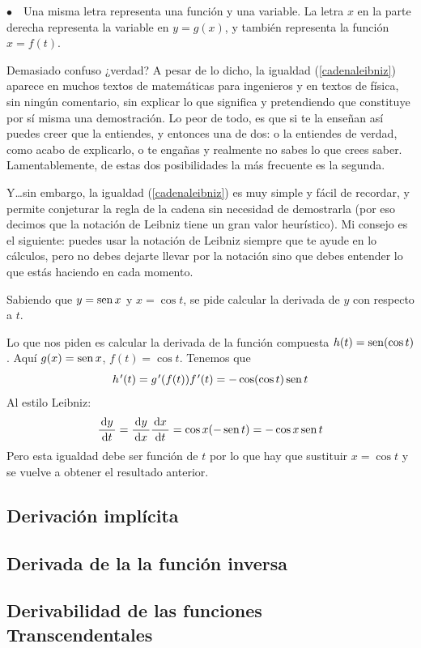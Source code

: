 \indent$\bullet\quad$Una misma letra representa una función y una
variable. La letra $x$ en la parte derecha representa la variable
en $y=g(x)$, y también representa la función $x=f(t)$.

Demasiado confuso ¿verdad? A pesar de lo dicho, la igualdad (\ref{cadenaleibniz})
aparece en muchos textos de matemáticas para ingenieros y en textos
de física, sin ningún comentario, sin explicar lo que significa y
pretendiendo que constituye por sí misma una demostración. Lo peor
de todo, es que si te la enseñan así puedes creer que la entiendes,
y entonces una de dos: o la entiendes de verdad, como acabo de explicarlo,
o te engañas y realmente no sabes lo que crees saber. Lamentablemente,
de estas dos posibilidades la más frecuente es la segunda.

Y…sin embargo, la igualdad (\ref{cadenaleibniz}) es muy simple y
fácil de recordar, y permite conjeturar la regla de la cadena sin
necesidad de demostrarla (por eso decimos que la notación de Leibniz
tiene un gran valor heurístico). Mi consejo es el siguiente: puedes
usar la notación de Leibniz siempre que te ayude en lo cálculos, pero
no debes dejarte llevar por la notación sino que debes entender lo
que estás haciendo en cada momento.

\begin{ejemplo} Sabiendo que $y=\operatorname{sen} x$ y $x=\cos t$, se pide calcular
la derivada de $y$ con respecto a $t$.

Lo que nos piden es calcular la derivada de la función compuesta $h(t)=\operatorname{sen}(\cos t)$.
Aquí $g(x)=\operatorname{sen} x$, $f(t)=\cos t$. Tenemos que 
\[
h\mbox{$^{\mspace{2mu}\prime}$}(t)=g\mbox{$^{\mspace{2mu}\prime}$}(f(t))f\mbox{$^{\mspace{2mu}\prime}$}(t)=-\cos(\cos t)\operatorname{sen} t
\]
Al estilo Leibniz: 
\[
\frac{\,\mathrm{d}y\,}{\,\mathrm{d}t\,}=\frac{\,\mathrm{d}y\,}{\,\mathrm{d}x\,}\frac{\,\mathrm{d}x\,}{\,\mathrm{d}t\,}=\cos x(-\operatorname{sen} t)=-\cos x\operatorname{sen} t
\]
Pero esta igualdad debe ser función de $t$ por lo que hay que sustituir
$x=\cos t$ y se vuelve a obtener el resultado anterior. \end{ejemplo}

\subsection{Derivación implícita}

\subsection{Derivada de la la función inversa}

\subsection{Derivabilidad de las funciones Transcendentales}

